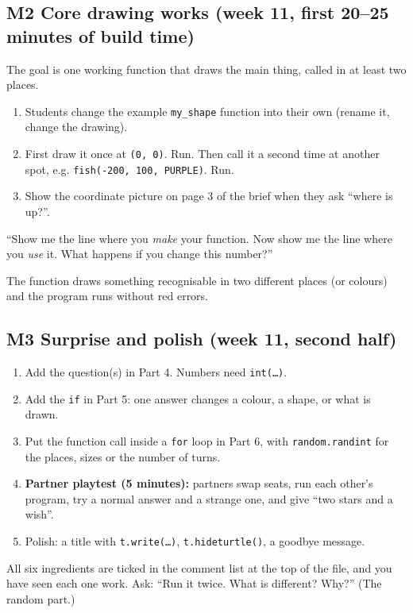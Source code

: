 \documentclass[level=1,teacher]{kidscode}
\begin{document}
\subsection{M2 Core drawing works (week 11, first 20--25 minutes of build time)}
The goal is one working function that draws the main thing, called in at least two places.
\begin{enumerate}[itemsep=2pt]
  \item Students change the example \texttt{my\_shape} function into their own (rename it, change the drawing).
  \item First draw it once at \texttt{(0, 0)}. Run. Then call it a second time at another spot,
        e.g. \texttt{fish(-200, 100, PURPLE)}. Run.
  \item Show the coordinate picture on page 3 of the brief when they ask \enquote{where is up?}.
\end{enumerate}
\begin{teacherscript}
\enquote{Show me the line where you \emph{make} your function. Now show me the line where you
\emph{use} it. What happens if you change this number?}
\end{teacherscript}
\begin{formativecheck}
The function draws something recognisable in two different places (or colours) and the program runs
without red errors.
\end{formativecheck}

\subsection{M3 Surprise and polish (week 11, second half)}
\begin{enumerate}[itemsep=2pt]
  \item Add the question(s) in Part 4. Numbers need \texttt{int(\dots)}.
  \item Add the \texttt{if} in Part 5: one answer changes a colour, a shape, or what is drawn.
  \item Put the function call inside a \texttt{for} loop in Part 6, with \texttt{random.randint} for the
        places, sizes or the number of turns.
  \item \textbf{Partner playtest (5 minutes):} partners swap seats, run each other's program, try a
        normal answer and a strange one, and give \enquote{two stars and a wish}.
  \item Polish: a title with \texttt{t.write(\dots)}, \texttt{t.hideturtle()}, a goodbye message.
\end{enumerate}
\begin{formativecheck}
All six ingredients are ticked in the comment list at the top of the file, and you have seen each one
work. Ask: \enquote{Run it twice. What is different? Why?} (The random part.)
\end{formativecheck}
\end{document}

